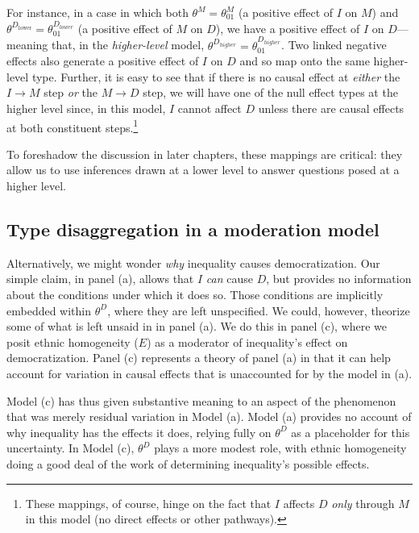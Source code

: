 \documentclass[
  12pt,
]{book}
\begin{document}
For instance, in a case in which both \(\theta^M=\theta^M_{01}\) (a positive effect of \(I\) on \(M\)) and \(\theta^{D_{\text{lower}}}=\theta_{01}^{D_{lower}}\) (a positive effect of \(M\) on \(D\)), we have a positive effect of \(I\) on \(D\)---meaning that, in the \emph{higher-level} model, \(\theta^{D_{higher}}=\theta^{D_{higher}}_{01}\). Two linked negative effects also generate a positive effect of \(I\) on \(D\) and so map onto the same higher-level type. Further, it is easy to see that if there is no causal effect at \emph{either} the \(I \rightarrow M\) step \emph{or} the \(M \rightarrow D\) step, we will have one of the null effect types at the higher level since, in this model, \(I\) cannot affect \(D\) unless there are causal effects at both constituent steps.\footnote{These mappings, of course, hinge on the fact that \(I\) affects \(D\) \emph{only} through \(M\) in this model (no direct effects or other pathways).}

To foreshadow the discussion in later chapters, these mappings are critical: they allow us to use inferences drawn at a lower level to answer questions posed at a higher level.

\hypertarget{type-disaggregation-in-a-moderation-model}{%
\subsection{Type disaggregation in a moderation model}\label{type-disaggregation-in-a-moderation-model}}

Alternatively, we might wonder \emph{why} inequality causes democratization. Our simple claim, in panel (a), allows that \(I\) \emph{can} cause \(D\), but provides no information about the conditions under which it does so. Those conditions are implicitly embedded within \(\theta^D\), where they are left unspecified. We could, however, theorize some of what is left unsaid in in panel (a). We do this in panel (c), where we posit ethnic homogeneity (\(E\)) as a moderator of inequality's effect on democratization. Panel (c) represents a theory of panel (a) in that it can help account for variation in causal effects that is unaccounted for by the model in (a).

Model (c) has thus given substantive meaning to an aspect of the phenomenon that was merely residual variation in Model (a). Model (a) provides no account of why inequality has the effects it does, relying fully on \(\theta^D\) as a placeholder for this uncertainty. In Model (c), \(\theta^D\) plays a more modest role, with ethnic homogeneity doing a good deal of the work of determining inequality's possible effects.
\end{document}
